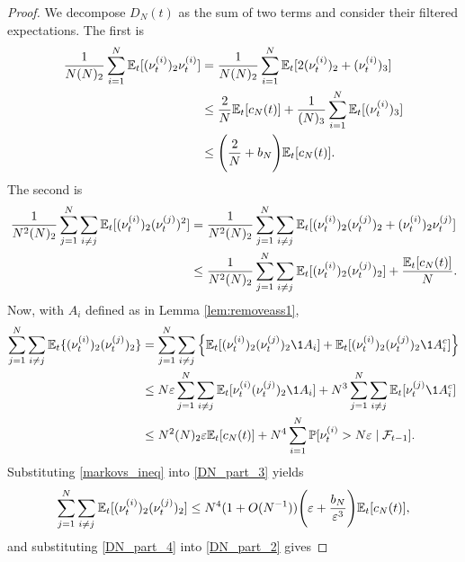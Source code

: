 \begin{proof}
We decompose $D_N(t)$ as the sum of two terms and consider their filtered expectations. The first is
\begin{align}
\frac{ 1 }{ N ( N )_2 } \sum_{ i = 1 }^N \mathbb{E}_t[ ( \nu_t^{(i)} )_2 \nu_t^{(i)} ] 
&= \frac{ 1 }{ N ( N )_2 } \sum_{ i = 1 }^N 
        \mathbb{E}_t[ 2 ( \nu_t^{(i)} )_2 + ( \nu_t^{(i)} )_3] \notag\\
&\leq \frac{ 2 }{ N } \mathbb{E}_t[ c_N( t )] + \frac{ 1 }{ ( N )_3 } \sum_{ i = 1 }^N 
        \mathbb{E}_t[ ( \nu_t^{(i)} )_3 ] \notag\\
&\leq \Bigg(\frac{ 2 }{ N } + b_N \Bigg) \mathbb{E}_t[ c_N( t ) ]. \label{DN_part_1}
\end{align}
The second is
\begin{align}
\frac{ 1 }{ N^2 ( N )_2 } \sum_{ j=1 }^N \sum_{ i \neq j } 
        \mathbb{E}_t[ ( \nu_t^{(i)} )_2 ( \nu_t^{(j)} )^2] 
&= \frac{ 1 }{ N^2 ( N )_2 } \sum_{ j=1 }^N \sum_{ i \neq j } 
        \mathbb{E}_t[ ( \nu_t^{(i)} )_2 ( \nu_t^{(j)} )_2 + ( \nu_t^{(i)} )_2 \nu_t^{(j)} ] \notag\\
&\leq \frac{ 1 }{ N^2 ( N )_2 } \sum_{ j=1 }^N \sum_{ i \neq j } 
        \mathbb{E}_t[ ( \nu_t^{(i)} )_2 ( \nu_t^{(j)} )_2 ] + \frac{ \mathbb{E}_t[ c_N( t ) ] }{ N } .         
        \label{DN_part_2}
\end{align}
Now, with $A_i$ defined as in Lemma \ref{lem:removeass1},
\begin{align}
\sum_{ j=1 }^N \sum_{ i \neq j } \Et\{ ( \nu_t^{(i)} )_2 ( \nu_t^{(j)} )_2\} 
&= \sum_{ j=1 }^N \sum_{ i \neq j } 
        \Big\{ \Et[ ( \nu_t^{(i)} )_2 ( \nu_t^{(j)} )_2 \1{ A_i } ]
        + \Et[ ( \nu_t^{(i)} )_2 ( \nu_t^{(j)} )_2 \1{ A_i^c } ] \Big\} \notag\\
&\leq N \varepsilon \sum_{ j=1 }^N \sum_{ i \neq j } 
        \Et[ \nu_t^{(i)} ( \nu_t^{(j)} )_2 \1{ A_i } ] 
        + N^3 \sum_{ j=1 }^N \sum_{ i \neq j } \Et[ \nu_t^{(j)} \1{ A_i^c } ] \notag\\
&\leq N^2 ( N )_2 \varepsilon \Et[ c_N( t )] + N^4 \sum_{ i = 1 }^N 
        \Prob[ \nu_t^{(i)} > N \varepsilon \mid \mathcal{F}_{t-1} ] . \label{DN_part_3}
\end{align}
Substituting \eqref{markovs_ineq} into \eqref{DN_part_3} yields
\begin{equation}
\sum_{ j=1 }^N \sum_{ i \neq j } \mathbb{E}_t[ ( \nu_t^{(i)} )_2 ( \nu_t^{(j)} )_2 ]
\leq N^4 (1 + O( N^{ -1 } ))
        \Bigg( \varepsilon + \frac{ b_N }{ \varepsilon^3 } \Bigg) \mathbb{E}_t[ c_N( t ) ] , \label{DN_part_4}
\end{equation}
and substituting \eqref{DN_part_4} into \eqref{DN_part_2} gives

\end{proof}
